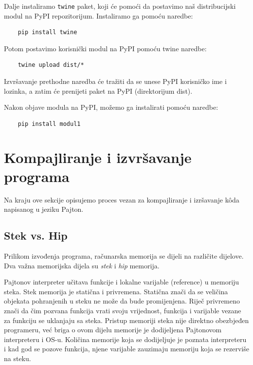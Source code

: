 Dalje instaliramo \texttt{twine} paket, koji će pomoći da postavimo naš distribucijski modul na PyPI repozitorijum. Instaliramo ga pomoću   naredbe:
\begin{verbatim}
	pip install twine
\end{verbatim}
Potom postavimo korisnički   modul na PyPI pomoću twine naredbe:
\begin{verbatim}
	twine upload dist/*
\end{verbatim}
Izvršavanje prethodne naredba će tražiti da se unese PyPI korisničko ime i lozinka, a zatim će prenijeti      paket na PyPI (direktorijum dist).

Nakon  objave  modula na PyPI, možemo ga instalirati pomoću   naredbe:
\begin{verbatim}
	pip install modul1
\end{verbatim}

\section{Kompajliranje i izvršavanje programa}

Na kraju ove sekcije opisujemo proces vezan za kompajliranje i izršavanje k\^oda napisanog u jeziku Pajton. %
\subsection{Stek vs. Hip} 


Prilikom izvođenja programa, računarska memorija se dijeli na različite dijelove. Dva važna memorijska dijela su \textit{stek} i \textit{hip} memorija. 

Pajtonov interpreter učitava funkcije i lokalne varijable (reference) u memoriju steka. 
Stek memorija je statična i privremena. Statična znači da se veličina objekata pohranjenih u steku ne može da bude promijenjena. Riječ privremeno znači da čim pozvana funkcija vrati svoju vrijednost, funkcija i   varijable vezane za funkciju se uklanjaju sa steka. Pristup memoriji steka nije direktno obezbjeđen programeru, već  briga o ovom dijelu memorije je dodijeljena Pajtonovom interpreteru i OS-u.  Količina memorije koja  se dodijeljuje je poznata interpreteru i kad god se pozove funkcija, njene varijable zauzimaju memoriju koja se rezerviše na steku.

